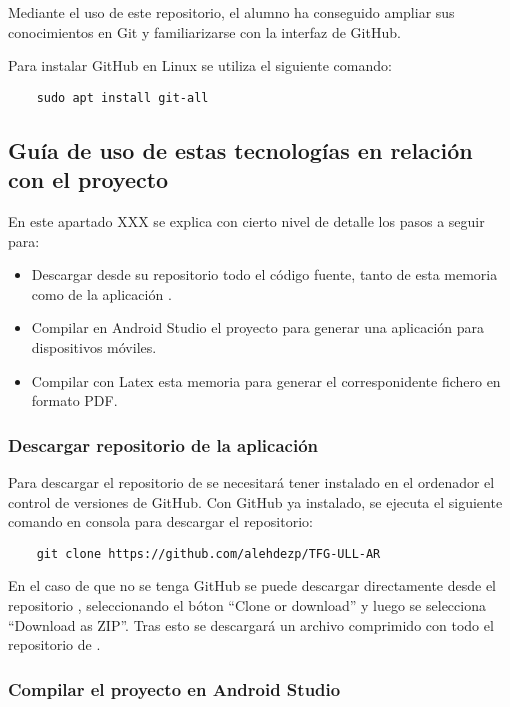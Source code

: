 Mediante el uso de este repositorio, el alumno ha conseguido ampliar sus conocimientos en Git y familiarizarse con la interfaz de GitHub.

Para instalar GitHub en Linux se utiliza el siguiente comando:
\begin{lstlisting}
    sudo apt install git-all
\end{lstlisting}

\subsection{Guía de uso de estas tecnologías en relación con el proyecto \ULLAR{}}
En este apartado XXX se explica con cierto nivel de detalle los pasos a seguir para:
\begin{itemize}
\item Descargar desde su repositorio todo el código fuente, tanto de esta memoria como de la aplicación \ULLAR{}.
\item Compilar en Android Studio el proyecto \ULLAR{} para generar una aplicación para dispositivos móviles.
\item Compilar con Latex esta memoria para generar el corresponidente fichero en formato PDF.
\end{itemize}

\subsubsection{Descargar repositorio de la aplicación}

Para descargar el repositorio de \ULLAR{} se necesitará tener instalado en el ordenador el control de versiones de GitHub. Con GitHub ya instalado, se ejecuta el siguiente comando en consola para descargar el repositorio:

\begin{lstlisting}
    git clone https://github.com/alehdezp/TFG-ULL-AR 
\end{lstlisting}

En el caso de que no se tenga GitHub se puede descargar directamente desde el repositorio \cite{URL::repositorioAplicacion}, seleccionando el bóton ``Clone or download'' y luego se selecciona ``Download as ZIP''. Tras esto se descargará un archivo comprimido con todo el repositorio de \ULLAR{}.


\subsubsection{Compilar el proyecto en Android Studio}

